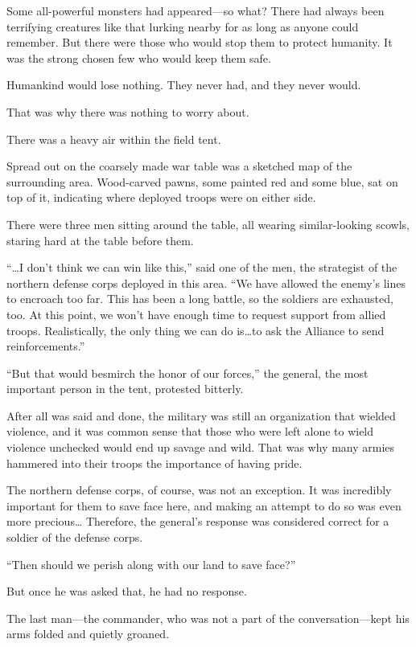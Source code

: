 Some all-powerful monsters had appeared—so what? There had always been terrifying creatures like that lurking nearby for as long as anyone could remember. But there were those who would stop them to protect humanity. It was the strong chosen few who would keep them safe.

Humankind would lose nothing. They never had, and they never would.

That was why there was nothing to worry about.

\icon

There was a heavy air within the field tent.

Spread out on the coarsely made war table was a sketched map of the surrounding area. Wood-carved pawns, some painted red and some blue, sat on top of it, indicating where deployed troops were on either side.

There were three men sitting around the table, all wearing similar-looking scowls, staring hard at the table before them.

“…I don’t think we can win like this,” said one of the men, the strategist of the northern defense corps deployed in this area. “We have allowed the enemy’s lines to encroach too far. This has been a long battle, so the soldiers are exhausted, too. At this point, we won’t have enough time to request support from allied troops. Realistically, the only thing we can do is…to ask the Alliance to send reinforcements.”

“But that would besmirch the honor of our forces,” the general, the most important person in the tent, protested bitterly.

After all was said and done, the military was still an organization that wielded violence, and it was common sense that those who were left alone to wield violence unchecked would end up savage and wild. That was why many armies hammered into their troops the importance of having pride.

The northern defense corps, of course, was not an exception. It was incredibly important for them to save face here, and making an attempt to do so was even more precious… Therefore, the general’s response was considered correct for a soldier of the defense corps.

“Then should we perish along with our land to save face?”

But once he was asked that, he had no response.

The last man—the commander, who was not a part of the conversation—kept his arms folded and quietly groaned.

